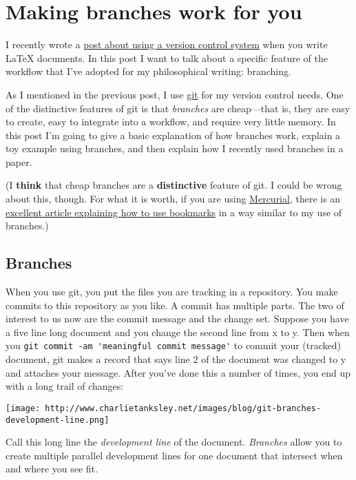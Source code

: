 \documentclass{article}
\begin{document}
\section{Making branches work for you}

I recently wrote a
\href{http://www.charlietanksley.net/philtex/using-a-version-control-system/}{post about using a version control system}
when you write LaTeX documents. In this post I want to talk about a
specific feature of the workflow that I've adopted for my
philosophical writing: branching.

As I mentioned in the previous post, I use
\href{http://git-scm.com/}{git} for my version control needs. One
of the distinctive features of git is that \emph{branches} are
cheap—that is, they are easy to create, easy to integrate into a
workflow, and require very little memory. In this post I'm going to
give a basic explanation of how branches work, explain a toy
example using branches, and then explain how I recently used
branches in a paper.

(I \textbf{think} that cheap branches are a \textbf{distinctive}
feature of git. I could be wrong about this, though. For what it is
worth, if you are using
\href{http://mercurial.selenic.com/}{Mercurial}, there is an
\href{http://stevelosh.com/blog/2009/08/a-guide-to-branching-in-mercurial/}{excellent article explaining how to use bookmarks}
in a way similar to my use of branches.)

\subsection{Branches}

When you use git, you put the files you are tracking in a
repository. You make commits to this repository as you like. A
commit has multiple parts. The two of interest to us now are the
commit message and the change set. Suppose you have a five line
long document and you change the second line from x to y. Then when
you \verb!git commit -am 'meaningful commit message'! to commit
your (tracked) document, git makes a record that says line 2 of the
document was changed to y and attaches your message. After you've
done this a number of times, you end up with a long trail of
changes:

\texttt{[image: http://www.charlietanksley.net/images/blog/git-branches-development-line.png]}

Call this long line the \emph{development line} of the document.
\emph{Branches} allow you to create multiple parallel development
lines for one document that intersect when and where you see fit.
\end{document}
